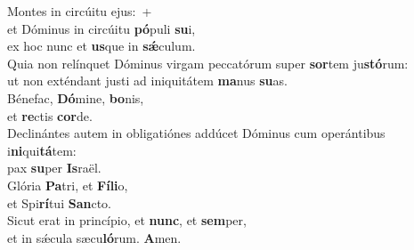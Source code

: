 \evenverse Montes in circúitu ejus:~+\\\evenverse  et Dóminus in circúitu \textbf{pó}puli \textbf{su}i,~\*\\
\evenverse ex hoc nunc et \textbf{us}que in \textbf{sǽ}culum.\\
\oddverse Quia non relínquet Dóminus virgam peccatórum super \textbf{sor}tem ju\textbf{stó}rum:~\*\\
\oddverse ut non exténdant justi ad iniquitátem \textbf{ma}nus \textbf{su}as.\\
\evenverse Bénefac, \textbf{Dó}mine, \textbf{bo}nis,~\*\\
\evenverse et \textbf{re}ctis \textbf{cor}de.\\
\oddverse Declinántes autem in obligatiónes addúcet Dóminus cum operántibus i\textbf{ni}qui\textbf{tá}tem:~\*\\
\oddverse pax \textbf{su}per \textbf{Is}raël.\\
\evenverse Glória \textbf{Pa}tri, et \textbf{Fí}\textbf{li}o,~\*\\
\evenverse et Spi\textbf{rí}tui \textbf{San}cto.\\
\oddverse Sicut erat in princípio, et \textbf{nunc}, et \textbf{sem}per,~\*\\
\oddverse et in sǽcula sæcu\textbf{ló}rum. \textbf{A}men.\\
